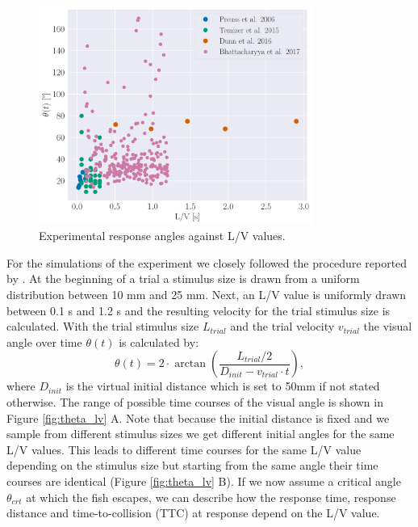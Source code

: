    \begin{figure}[!h]
    	\begin{center}
			\includegraphics[width=0.8\textwidth]{figure_expm_theta_vs_lv.pdf}
    	\end{center}
    	\caption{Experimental response angles against L/V values.}
    	\label{fig:expm_theta_lv}
    \end{figure}
	For the simulations of the experiment we closely followed the procedure reported by 
	\cite{Bhattacharyya2017}.
	At the beginning of a trial a stimulus size is drawn from a uniform distribution between 10 mm and 25 mm.
	Next, an L/V value is uniformly drawn between 0.1 s and 1.2 s and the resulting velocity for the 
	trial stimulus size is calculated.
	With the trial stimulus size $L_{trial}$ and the trial velocity $v_{trial}$ the visual angle 
	over time $\theta(t)$ is calculated by:
	\begin{equation}
	\theta (t) = 2\cdot \arctan(\frac{L_{trial}/2}{D_{init} - v_{trial}\cdot t}),
	\label{eq:theta}
	\end{equation}
	where $D_{init}$ is the virtual initial distance which is set to 50mm if not stated otherwise.
    The range of possible time courses of the visual angle is shown in Figure \ref{fig:theta_lv} A.
    Note that because the initial distance is fixed and we sample from different stimulus sizes we get different initial angles for the same L/V values.
    This leads to different time courses for the same L/V value depending on the stimulus size but starting from the same angle their time courses are identical (Figure \ref{fig:theta_lv} B).
    If we now assume a critical angle $\theta_{crt}$ at which the fish escapes, we can describe how the response time, response distance and time-to-collision (TTC) at response depend on the L/V value.

